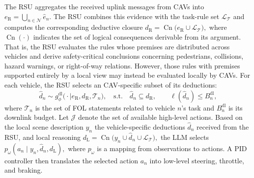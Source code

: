 \documentclass[10pt, conference, letterpaper]{ IEEEtran}
\theoremstyle{bfnote}
\begin{document}
The RSU aggregates the received uplink messages from CAVs into
$
    e_{\mathrm{R}}
    =
    \bigcup_{n\in\mathcal{N}}\hat e_n.
$
The RSU combines this evidence with the task-rule set $\mathcal{L}_{\mathcal{T}}$ and computes the corresponding deductive closure
$
    d_{\mathrm{R}}
    =
    \operatorname{Cn}
    \bigl(e_{\mathrm{R}}\cup\mathcal{L}_{\mathcal{T}}\bigr),
$
where $\operatorname{Cn}(\cdot)$ indicates the set of logical consequences derivable from its argument. That is, the RSU evaluates
the rules whose premises are distributed across vehicles and
derive safety-critical conclusions concerning pedestrians, collisions, hazard warnings, or right-of-way relations. However, those rules with premises supported entirely by a local view may instead be
evaluated locally by CAVs. For each vehicle, the RSU selects an CAV-specific subset of its deductions:
\begin{equation}
\label{eq:downlink-selection}
\hat d_n
\sim
g_{\phi}^{\mathrm{dl}}
\bigl(\cdot\mid e_{\mathrm R}, d_{\mathrm R},\mathcal{T}_n\bigr),
\quad
\text{s.t.}
\quad
\hat d_n\subseteq d_{\mathrm R},
\qquad
\ell(\hat d_n)\leq B_n^{\mathrm{dl}},
\end{equation}
where $\mathcal{T}_n$ is the set of FOL statements related to vehicle $n$'s task and
$B_n^{\mathrm{dl}}$ is its downlink budget. Let
$
\mathcal{J}
$
denote the set of available high-level actions. Based on the local scene
description $y_n$ the vehicle-specific deductions $\hat d_n$ received
from the RSU, and local reasoning $
    d_{\mathrm{L}}
    =
    \operatorname{Cn}
    \bigl(y_n\cup\hat d_n\cup\mathcal{L}_{\mathcal{T}}\bigr),
$ the LLM selects
$
p_{\omega}\!\left(a_n\mid y_n,\hat d_n, d_{\mathrm{L}}\right),
$
where $p_{\omega}$ is a mapping from observations to actions. A PID
controller then translates the selected action $a_n$ into low-level
steering, throttle, and braking.




\end{document}
